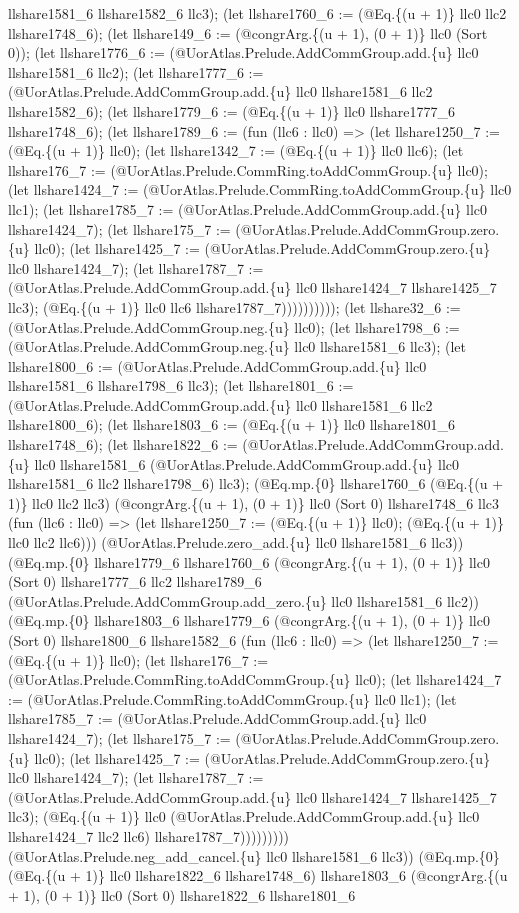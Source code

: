 \documentclass[11pt]{article}
\begin{document}
llshare1581\_6 llshare1582\_6 llc3); (let llshare1760\_6 := (@Eq.\{(u + 1)\} llc0 llc2 llshare1748\_6); (let llshare149\_6 := (@congrArg.\{(u + 1), (0 + 1)\} llc0 (Sort 0)); (let llshare1776\_6 := (@UorAtlas.Prelude.AddCommGroup.add.\{u\} llc0 llshare1581\_6 llc2); (let llshare1777\_6 := (@UorAtlas.Prelude.AddCommGroup.add.\{u\} llc0 llshare1581\_6 llc2 llshare1582\_6); (let llshare1779\_6 := (@Eq.\{(u + 1)\} llc0 llshare1777\_6 llshare1748\_6); (let llshare1789\_6 := (fun (llc6 : llc0) => (let llshare1250\_7 := (@Eq.\{(u + 1)\} llc0); (let llshare1342\_7 := (@Eq.\{(u + 1)\} llc0 llc6); (let llshare176\_7 := (@UorAtlas.Prelude.CommRing.toAddCommGroup.\{u\} llc0); (let llshare1424\_7 := (@UorAtlas.Prelude.CommRing.toAddCommGroup.\{u\} llc0 llc1); (let llshare1785\_7 := (@UorAtlas.Prelude.AddCommGroup.add.\{u\} llc0 llshare1424\_7); (let llshare175\_7 := (@UorAtlas.Prelude.AddCommGroup.zero.\{u\} llc0); (let llshare1425\_7 := (@UorAtlas.Prelude.AddCommGroup.zero.\{u\} llc0 llshare1424\_7); (let llshare1787\_7 := (@UorAtlas.Prelude.AddCommGroup.add.\{u\} llc0 llshare1424\_7 llshare1425\_7 llc3); (@Eq.\{(u + 1)\} llc0 llc6 llshare1787\_7)))))))))); (let llshare32\_6 := (@UorAtlas.Prelude.AddCommGroup.neg.\{u\} llc0); (let llshare1798\_6 := (@UorAtlas.Prelude.AddCommGroup.neg.\{u\} llc0 llshare1581\_6 llc3); (let llshare1800\_6 := (@UorAtlas.Prelude.AddCommGroup.add.\{u\} llc0 llshare1581\_6 llshare1798\_6 llc3); (let llshare1801\_6 := (@UorAtlas.Prelude.AddCommGroup.add.\{u\} llc0 llshare1581\_6 llc2 llshare1800\_6); (let llshare1803\_6 := (@Eq.\{(u + 1)\} llc0 llshare1801\_6 llshare1748\_6); (let llshare1822\_6 := (@UorAtlas.Prelude.AddCommGroup.add.\{u\} llc0 llshare1581\_6 (@UorAtlas.Prelude.AddCommGroup.add.\{u\} llc0 llshare1581\_6 llc2 llshare1798\_6) llc3); (@Eq.mp.\{0\} llshare1760\_6 (@Eq.\{(u + 1)\} llc0 llc2 llc3) (@congrArg.\{(u + 1), (0 + 1)\} llc0 (Sort 0) llshare1748\_6 llc3 (fun (llc6 : llc0) => (let llshare1250\_7 := (@Eq.\{(u + 1)\} llc0); (@Eq.\{(u + 1)\} llc0 llc2 llc6))) (@UorAtlas.Prelude.zero\_add.\{u\} llc0 llshare1581\_6 llc3)) (@Eq.mp.\{0\} llshare1779\_6 llshare1760\_6 (@congrArg.\{(u + 1), (0 + 1)\} llc0 (Sort 0) llshare1777\_6 llc2 llshare1789\_6 (@UorAtlas.Prelude.AddCommGroup.add\_zero.\{u\} llc0 llshare1581\_6 llc2)) (@Eq.mp.\{0\} llshare1803\_6 llshare1779\_6 (@congrArg.\{(u + 1), (0 + 1)\} llc0 (Sort 0) llshare1800\_6 llshare1582\_6 (fun (llc6 : llc0) => (let llshare1250\_7 := (@Eq.\{(u + 1)\} llc0); (let llshare176\_7 := (@UorAtlas.Prelude.CommRing.toAddCommGroup.\{u\} llc0); (let llshare1424\_7 := (@UorAtlas.Prelude.CommRing.toAddCommGroup.\{u\} llc0 llc1); (let llshare1785\_7 := (@UorAtlas.Prelude.AddCommGroup.add.\{u\} llc0 llshare1424\_7); (let llshare175\_7 := (@UorAtlas.Prelude.AddCommGroup.zero.\{u\} llc0); (let llshare1425\_7 := (@UorAtlas.Prelude.AddCommGroup.zero.\{u\} llc0 llshare1424\_7); (let llshare1787\_7 := (@UorAtlas.Prelude.AddCommGroup.add.\{u\} llc0 llshare1424\_7 llshare1425\_7 llc3); (@Eq.\{(u + 1)\} llc0 (@UorAtlas.Prelude.AddCommGroup.add.\{u\} llc0 llshare1424\_7 llc2 llc6) llshare1787\_7))))))))) (@UorAtlas.Prelude.neg\_add\_cancel.\{u\} llc0 llshare1581\_6 llc3)) (@Eq.mp.\{0\} (@Eq.\{(u + 1)\} llc0 llshare1822\_6 llshare1748\_6) llshare1803\_6 (@congrArg.\{(u + 1), (0 + 1)\} llc0 (Sort 0) llshare1822\_6 llshare1801\_6 
\end{document}
